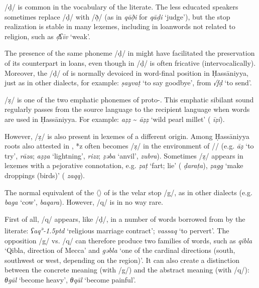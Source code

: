 \documentclass[output=paper]{langsci/langscibook}
\begin{document}
/ḍ/ is common in the vocabulary of the literate. The less educated speakers sometimes replace /ḍ/ with /ð̣/ (as in \textit{qāð̣i} for \textit{qāḍi} ‘judge’), but the stop realization is stable in many lexemes, including in {loanwords} not related to religion, such as \textit{ḍʕīv} ‘weak’.

The presence of the same {phoneme} /ḍ/ in  might have facilitated the preservation of its counterpart in   loans, even though in  /ḍ/ is often fricative (intervocalically). Moreover, the /ḍ/ of  is normally devoiced in word-final position in Ḥassāniyya, just as in other  dialects, for example: \textit{ṣayvaṭ} ‘to say goodbye’, from  \textit{√fḍ} ‘to send’.

/ẓ/ is one of the two {emphatic} phonemes of proto-. This {emphatic} {sibilant} sound regularly passes from the {source language} to the {recipient language} when  words are used in Ḥassāniyya. For example: \textit{aẓẓ} \~{} \textit{āẓẓ} ‘wild pearl millet’ ( \textit{īẓi}).

However, /ẓ/ is also present in lexemes of a different origin. Among Ḥassāniyya {roots} also attested in  , *z often becomes /ẓ/ in the environment of /{\R}/ (e.g. \textit{{\R}āẓ} ‘to try’,  \textit{rāza}; \textit{{\R}aẓẓa} ‘lightning’,  \textit{rizz}; \textit{ẓəb{\R}a} ‘anvil’,  \textit{zubra}). Sometimes /ẓ/ appears in lexemes with a pejorative connotation, e.g. \textit{ẓ{\R}aṭ} ‘fart; lie’ ( \textit{ḍaraṭa}), \textit{ẓagg} ‘make droppings (birds)’ ( \textit{zaqq}).

The normal equivalent of the 〈{}〉 of   is the velar stop /g/, as in other  dialects (e.g. \textit{bag{\R}a} ‘cow’,  \textit{baqara}). However, /q/ is in no way rare.

First of all, /q/ appears, like /ḍ/, in a number of words borrowed from   by the literate: \textit{ʕaq\kern 0.5pt\textsuperscript{ə}\kern -1.5ptd} ‘religious marriage contract’; \textit{vassaq} ‘to pervert’. The opposition /g/ vs. /q/ can therefore produce two families of words, such as \textit{qibla} ‘Qibla, direction of {Mecca}’ and \textit{gəbla} ‘one of the cardinal directions (south, southwest or west, depending on the region)’. It can also create a distinction between the concrete meaning (with /g/) and the abstract meaning (with /q/): \textit{θgāl} ‘become heavy’, \textit{θqāl} ‘become painful’.
\end{document}

